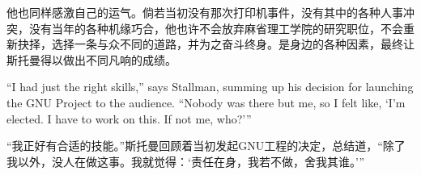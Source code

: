 \ifdefined\chs
他也同样感激自己的运气。倘若当初没有那次打印机事件，没有其中的各种人事冲突，没有当年的各种机缘巧合，他也许不会放弃麻省理工学院的研究职位，不会重新抉择，选择一条与众不同的道路，并为之奋斗终身。是身边的各种因素，最终让斯托曼得以做出不同凡响的成绩。
\fi

\ifdefined\eng
``I had just the right skills,'' says Stallman, summing up his decision for launching the GNU Project to the audience. ``Nobody was there but me, so I felt like, `I'm elected. I have to work on this. If not me, who?'\hspace{0.01in}''
\fi

\ifdefined\chs
``我正好有合适的技能。''斯托曼回顾着当初发起GNU工程的决定，总结道，``除了我以外，没人在做这事。我就觉得：`责任在身，我若不做，舍我其谁。'\hspace{0.01in}''
\fi

\theendnotes
\setcounter{endnote}{0}

